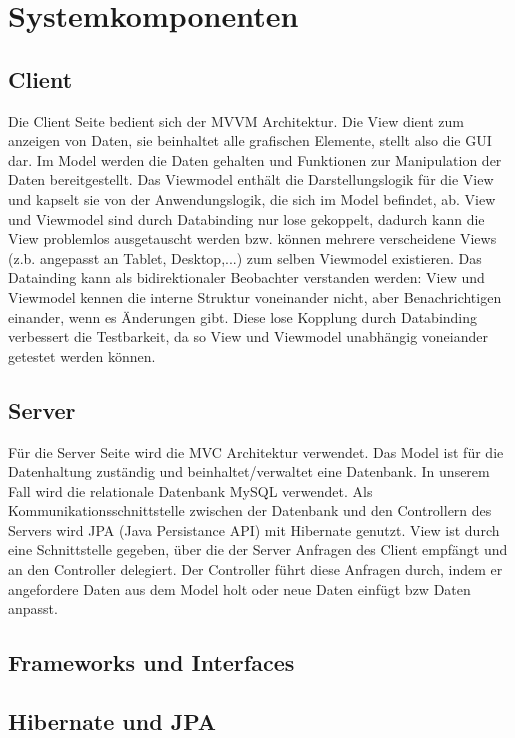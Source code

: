 \documentclass[a4paper]{scrreprt}
\begin{document}
\section{Systemkomponenten}

\subsection{Client}
Die Client Seite bedient sich der MVVM Architektur. Die View dient zum anzeigen von Daten, sie beinhaltet alle grafischen Elemente, stellt also die GUI dar. Im Model werden die Daten gehalten und Funktionen zur Manipulation der Daten bereitgestellt.
Das Viewmodel enthält die Darstellungslogik für die View und kapselt sie von der Anwendungslogik, die sich im Model befindet, ab.
View und Viewmodel sind durch Databinding nur lose gekoppelt, dadurch kann die View problemlos ausgetauscht werden bzw. können mehrere verscheidene Views (z.b. angepasst an Tablet, Desktop,...) zum selben Viewmodel existieren.
Das Datainding kann als bidirektionaler Beobachter verstanden werden: View und Viewmodel kennen die interne Struktur voneinander nicht, aber Benachrichtigen einander, wenn es Änderungen gibt. Diese lose Kopplung durch Databinding verbessert die Testbarkeit, da so View und Viewmodel unabhängig voneiander getestet werden können.

\subsection{Server}
Für die Server Seite wird die MVC Architektur verwendet.
Das Model ist für die Datenhaltung zuständig und beinhaltet/verwaltet eine Datenbank.  In unserem Fall wird die relationale Datenbank MySQL verwendet. Als Kommunikationsschnittstelle zwischen der Datenbank und den Controllern des Servers wird JPA (Java Persistance API) mit Hibernate genutzt.
View ist durch eine Schnittstelle gegeben, über die der Server Anfragen des Client empfängt und an den Controller delegiert. Der Controller führt diese Anfragen durch, indem er angefordere Daten aus dem Model holt oder neue Daten einfügt bzw Daten anpasst.

\subsection{Frameworks und Interfaces}
\subsection*{Hibernate und JPA}
\end{document}
